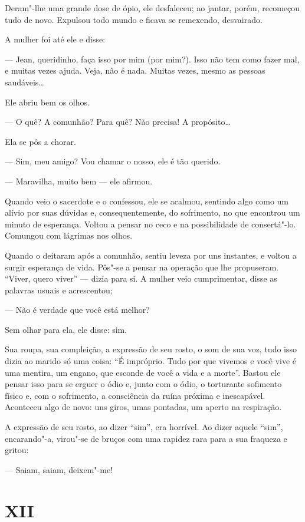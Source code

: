 Deram"-lhe uma grande dose de ópio, ele desfaleceu; ao jantar, porém,
recomeçou tudo de novo. Expulsou todo mundo e ficava se remexendo,
desvairado.

A mulher foi até ele e disse:

--- Jean, queridinho, faça isso por mim (por mim?). Isso não tem como
fazer mal, e muitas vezes ajuda. Veja, não é nada. Muitas vezes, mesmo
as pessoas saudáveis\ldots{}

Ele abriu bem os olhos.

--- O quê? A comunhão? Para quê? Não precisa! A propósito\ldots{}

Ela se pôs a chorar.

--- Sim, meu amigo? Vou chamar o nosso, ele é tão querido.

--- Maravilha, muito bem --- ele afirmou.

Quando veio o sacerdote e o confessou, ele se acalmou, sentindo algo
como um alívio por suas dúvidas e, consequentemente, do sofrimento, no
que encontrou um minuto de esperança. Voltou a pensar no ceco e na
possibilidade de consertá"-lo. Comungou com lágrimas nos olhos.

Quando o deitaram após a comunhão, sentiu leveza por uns instantes, e
voltou a surgir esperança de vida. Pôs"-se a pensar na operação que lhe
propuseram. ``Viver, quero viver'' --- dizia para si. A mulher veio
cumprimentar, disse as palavras usuais e acrescentou;

--- Não é verdade que você está melhor?

Sem olhar para ela, ele disse: sim.

Sua roupa, sua compleição, a expressão de seu rosto, o som de sua voz,
tudo isso dizia ao marido só uma coisa: ``É impróprio. Tudo por que
vivemos e você vive é uma mentira, um engano, que esconde de você a vida
e a morte''. Bastou ele pensar isso para se erguer o ódio e, junto com o
ódio, o torturante sofimento físico e, com o sofrimento, a consciência
da ruína próxima e inescapável. Aconteceu algo de novo: uns giros, umas
pontadas, um aperto na respiração.

A expressão de seu rosto, ao dizer ``sim'', era horrível. Ao dizer
aquele ``sim'', encarando"-a, virou"-se de bruços com uma rapidez rara
para a sua fraqueza e gritou:

--- Saiam, saiam, deixem"-me!

\section{XII}

